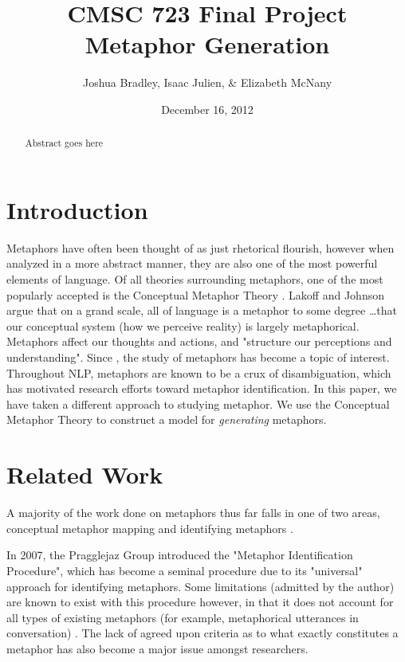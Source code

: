 \documentclass[12pt]{article}
\title{CMSC 723 Final Project\\
Metaphor Generation}
\author{Joshua Bradley, Isaac Julien, \& Elizabeth McNany}
\date{December 16, 2012}
\begin{document}
\maketitle

\begin{abstract}
Abstract goes here
\end{abstract}

\newpage
\tableofcontents
\newpage

\section{Introduction}

Metaphors have often been thought of as just rhetorical flourish, however when analyzed in a more abstract manner, they are also one of the most powerful elements of language. Of all theories surrounding metaphors, one of the most popularly accepted is the Conceptual Metaphor Theory \cite{lakoff80}. Lakoff and Johnson argue that on a grand scale, all of language is a metaphor to some degree \ldots that our conceptual system (how we perceive reality) is largely metaphorical. Metaphors affect our thoughts and actions, and "structure our perceptions and understanding". Since \cite{lakoff80}, the study of metaphors has become a topic of interest. Throughout NLP, metaphors are known to be a crux of disambiguation, which has motivated research efforts toward metaphor identification. In this paper, we have taken a different approach to studying metaphor. We use the Conceptual Metaphor Theory to construct a model for \emph{generating} metaphors.

\section{Related Work}

A majority of the work done on metaphors thus far falls in one of two areas, conceptual metaphor mapping \cite{lakoff80}\cite{lakoff89} and identifying metaphors \cite{shutova101}\cite{pragglejaz}.

In 2007, the Pragglejaz Group introduced the "Metaphor Identification Procedure", which has become a seminal procedure due to its "universal" approach for identifying metaphors. Some limitations (admitted by the author) are known to exist with this procedure however, in that it does not account for all types of existing metaphors (for example, metaphorical utterances in conversation) \cite{pragglejaz}. The lack of agreed upon criteria as to what exactly constitutes a metaphor has also become a major issue amongst researchers.
\end{document}
